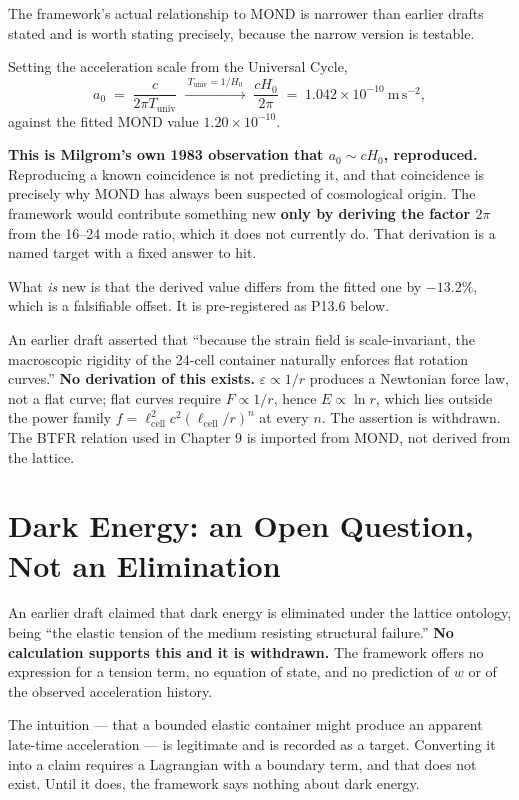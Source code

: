 \documentclass[11pt, letterpaper, openany]{book}
\begin{document}
The framework's actual relationship to MOND is narrower than earlier drafts stated and is worth
stating precisely, because the narrow version is testable.

Setting the acceleration scale from the Universal Cycle,
\[
a_0 \;=\; \frac{c}{2\pi T_{\mathrm{univ}}}
\;\xrightarrow{\;T_{\mathrm{univ}} = 1/H_0\;}\;
\frac{cH_0}{2\pi} \;=\; 1.042 \times 10^{-10}\ \mathrm{m\,s^{-2}},
\]
against the fitted MOND value $1.20 \times 10^{-10}$.

\begin{warningbox}
\textbf{This is Milgrom's own 1983 observation that $a_0 \sim cH_0$, reproduced.} Reproducing a
known coincidence is not predicting it, and that coincidence is precisely why MOND has always been
suspected of cosmological origin. The framework would contribute something new \textbf{only by
deriving the factor $2\pi$} from the 16--24 mode ratio, which it does not currently do. That
derivation is a named target with a fixed answer to hit.

\medskip
What \emph{is} new is that the derived value differs from the fitted one by $-13.2\%$, which is a
falsifiable offset. It is pre-registered as P13.6 below.
\end{warningbox}

\begin{correctionbox}
An earlier draft asserted that ``because the strain field is scale-invariant, the macroscopic
rigidity of the 24-cell container naturally enforces flat rotation curves.'' \textbf{No derivation of
this exists.} $\varepsilon \propto 1/r$ produces a Newtonian force law, not a flat curve; flat curves
require $F \propto 1/r$, hence $E \propto \ln r$, which lies outside the power family
$f = \ell_{\mathrm{cell}}^2c^2(\ell_{\mathrm{cell}}/r)^n$ at every $n$. The assertion is withdrawn.
The BTFR relation used in Chapter 9 is imported from MOND, not derived from the lattice.
\end{correctionbox}

\section{Dark Energy: an Open Question, Not an Elimination}

\begin{correctionbox}
An earlier draft claimed that dark energy is eliminated under the lattice ontology, being ``the
elastic tension of the medium resisting structural failure.'' \textbf{No calculation supports this
and it is withdrawn.} The framework offers no expression for a tension term, no equation of state,
and no prediction of $w$ or of the observed acceleration history.

\medskip
The intuition --- that a bounded elastic container might produce an apparent late-time acceleration
--- is legitimate and is recorded as a target. Converting it into a claim requires a Lagrangian with
a boundary term, and that does not exist. Until it does, the framework says nothing about dark
energy.
\end{correctionbox}
\end{document}
